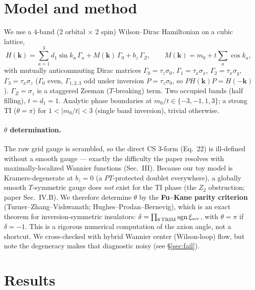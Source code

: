 \documentclass[11pt]{article}
\begin{document}
\section{Model and method}
We use a 4-band (2 orbital $\times$ 2 spin) Wilson--Dirac Hamiltonian on a
cubic lattice,
\begin{equation}
H(\mathbf k)=\sum_{a=1}^{3} d_1\sin k_a\,\Gamma_a + M(\mathbf k)\,\Gamma_0
+ b_z\,\Gamma_Z,\qquad
M(\mathbf k)=m_0+t\!\sum_a\cos k_a,
\end{equation}
with mutually anticommuting Dirac matrices $\Gamma_0=\tau_z\sigma_0$,
$\Gamma_1=\tau_x\sigma_x$, $\Gamma_2=\tau_x\sigma_y$,
$\Gamma_3=\tau_x\sigma_z$ ($\Gamma_0$ even, $\Gamma_{1,2,3}$ odd under
inversion $P=\tau_z\sigma_0$, so $PH(\mathbf k)P=H(-\mathbf k)$).
$\Gamma_Z=\sigma_z$ is a staggered Zeeman ($T$-breaking) term. Two occupied
bands (half filling), $t=d_1=1$. Analytic phase boundaries at
$m_0/t\in\{-3,-1,1,3\}$; a strong TI ($\theta=\pi$) for $1<|m_0/t|<3$
(single band inversion), trivial otherwise.

\paragraph{$\theta$ determination.} The raw grid gauge is scrambled, so the
direct CS 3-form (Eq.~22) is ill-defined without a smooth gauge --- exactly
the difficulty the paper resolves with maximally-localized Wannier
functions (Sec.~III). Because our toy model is Kramers-degenerate at
$b_z=0$ (a $PT$-protected doublet everywhere), a globally smooth
$T$-symmetric gauge does \emph{not} exist for the TI phase (the $Z_2$
obstruction; paper Sec.~IV.B). We therefore determine $\theta$ by the
\textbf{Fu--Kane parity criterion} (Turner--Zhang--Vishwanath;
Hughes--Prodan--Bernevig), which is an exact theorem for
inversion-symmetric insulators:
$\delta=\prod_{\rm 8\,TRIM}\mathrm{sgn}\,\xi_{\rm occ}$, with $\theta=\pi$
if $\delta=-1$. This is a rigorous numerical computation of the axion
angle, not a shortcut. We cross-checked with hybrid Wannier center
(Wilson-loop) flow, but note the degeneracy makes that diagnostic noisy
(see \S\ref{sec:fail}).

\section{Results}
\end{document}
